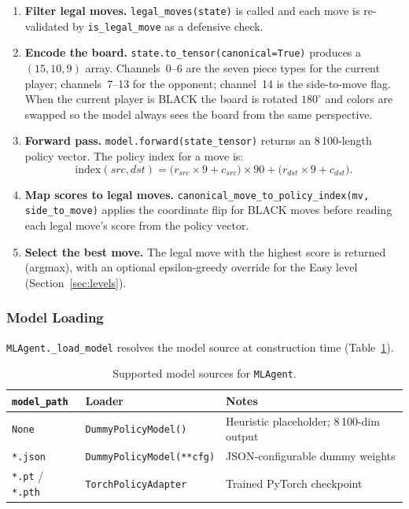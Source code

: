 \begin{enumerate}
  \item \textbf{Filter legal moves.}
        \texttt{legal\_moves(state)} is called and each move is
        re-validated by \texttt{is\_legal\_move} as a defensive check.
  \item \textbf{Encode the board.}
        \texttt{state.to\_tensor(canonical=True)} produces a
        $(15, 10, 9)$ array.  Channels~0--6 are the seven piece types
        for the current player; channels~7--13 for the opponent;
        channel~14 is the side-to-move flag.  When the current player
        is BLACK the board is rotated $180^\circ$ and colors are swapped
        so the model always sees the board from the same perspective.
  \item \textbf{Forward pass.}
        \texttt{model.forward(state\_tensor)} returns an 8\,100-length
        policy vector.  The policy index for a move is:
        \begin{equation}
          \text{index}(src, dst)
          = \bigl(r_{src} \times 9 + c_{src}\bigr) \times 90
          + \bigl(r_{dst} \times 9 + c_{dst}\bigr).
          \label{eq:policy}
        \end{equation}
  \item \textbf{Map scores to legal moves.}
        \texttt{canonical\_move\_to\_policy\_index(mv, side\_to\_move)}
        applies the coordinate flip for BLACK moves before reading each
        legal move's score from the policy vector.
  \item \textbf{Select the best move.}
        The legal move with the highest score is returned (argmax), with
        an optional epsilon-greedy override for the Easy level
        (Section~\ref{sec:levels}).
\end{enumerate}

\subsubsection{Model Loading}

\texttt{MLAgent.\_load\_model} resolves the model source at construction
time (Table~\ref{tab:model-sources}).

\begin{table}[H]
\centering
\caption{Supported model sources for \texttt{MLAgent}.}
\label{tab:model-sources}
\begin{tabular}{lll}
\toprule
\textbf{\texttt{model\_path}} & \textbf{Loader} & \textbf{Notes} \\
\midrule
\texttt{None} & \texttt{DummyPolicyModel()} &
  Heuristic placeholder; 8\,100-dim output \\
\texttt{*.json} & \texttt{DummyPolicyModel(**cfg)} &
  JSON-configurable dummy weights \\
\texttt{*.pt} / \texttt{*.pth} & \texttt{TorchPolicyAdapter} &
  Trained PyTorch checkpoint \\
\bottomrule
\end{tabular}
\end{table}

